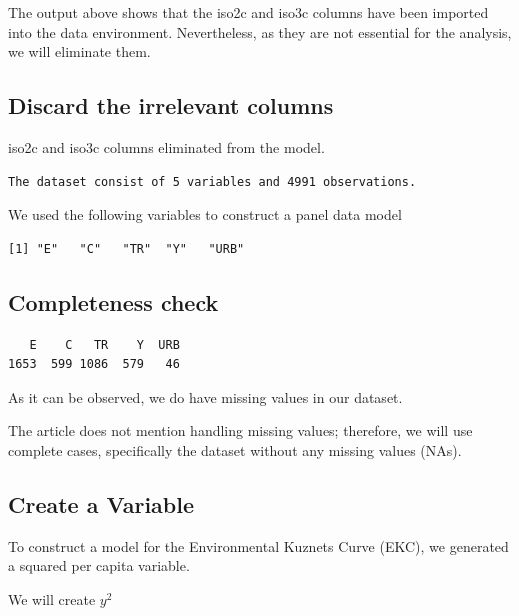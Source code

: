 \documentclass[
  11pt,
]{article}
\newenvironment{Shaded}{\begin{snugshade}}{\end{snugshade}}
\newcommand{\FunctionTok}[1]{\textcolor[rgb]{0.28,0.35,0.67}{#1}}
\newcommand{\NormalTok}[1]{\textcolor[rgb]{0.00,0.23,0.31}{#1}}
\newcommand{\OtherTok}[1]{\textcolor[rgb]{0.00,0.23,0.31}{#1}}
\newcommand{\SpecialCharTok}[1]{\textcolor[rgb]{0.37,0.37,0.37}{#1}}
\begin{document}
The output above shows that the iso2c and iso3c columns have been
imported into the data environment. Nevertheless, as they are not
essential for the analysis, we will eliminate them.

\hypertarget{discard-the-irrelevant-columns}{%
\subsection{Discard the irrelevant
columns}\label{discard-the-irrelevant-columns}}

iso2c and iso3c columns eliminated from the model.

\begin{verbatim}
The dataset consist of 5 variables and 4991 observations.
\end{verbatim}

We used the following variables to construct a panel data model

\begin{verbatim}
[1] "E"   "C"   "TR"  "Y"   "URB"
\end{verbatim}

\hypertarget{completeness-check}{%
\subsection{Completeness check}\label{completeness-check}}

\begin{verbatim}
   E    C   TR    Y  URB 
1653  599 1086  579   46 
\end{verbatim}

As it can be observed, we do have missing values in our dataset.

The article does not mention handling missing values; therefore, we will
use complete cases, specifically the dataset without any missing values
(NAs).

\hypertarget{create-a-variable}{%
\subsection{Create a Variable}\label{create-a-variable}}

To construct a model for the Environmental Kuznets Curve (EKC), we
generated a squared per capita variable.

We will create \(y^2\)

\begin{Shaded}
\end{Shaded}
\end{document}

